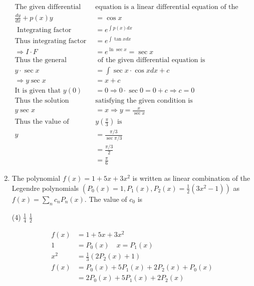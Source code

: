 \begin{enumerate}[label=\color{ocre}\textbf{\arabic*.}]
{}
\begin{answer}
	$$
	\begin{aligned}
	\text{The given differential }&\text{equation is a linear differential equation of the form}\\
	\frac{d y}{d x}+p(x) y&=\cos x\\
	\text{	Integrating factor }&=e^{\int p(x) d x}\\
	\text{Thus integrating factor }&=e^{\int \tan x d x}\\
	\Rightarrow I \cdot F&=e^{\ln \sec x}=\sec x\\
	\text{Thus the general solution}&\text{ of the given differential equation is}\\
	y \cdot \sec x&=\int \sec x \cdot \cos x d x+c\\
	\Rightarrow y \sec x&=x+c\\
	\text{It is given that }y(0)&=0 \Rightarrow 0 \cdot \sec 0=0+c \Rightarrow c=0\\
	\text{Thus the solution }&\text{satisfying the given condition is}\\
	y \sec x&=x \Rightarrow y=\frac{x}{\sec x}\\
	\text{Thus the value of }&y\left(\frac{\pi}{3}\right)\text{ is}\\
	y&=\frac{\pi / 3}{\sec \pi / 3} \\&=\frac{\pi / 3}{2}\\&=\frac{\pi}{6}
	\end{aligned}
	$$
\end{answer}
\item The polynomial $f(x)=1+5 x+3 x^{2}$ is written as linear combination of the Legendre polynomials
$\left(P_{0}(x)=1, P_{1}(x), P_{2}(x)=\frac{1}{2}\left(3 x^{2}-1\right)\right)$ as $f(x)=\sum_{n} c_{n} P_{n}(x)$. The value of $c_{0}$ is
{}
\begin{tasks}(4)
	\task[\textbf{A.}] $\frac{1}{4}$
	\task[\textbf{B.}] $\frac{1}{2}$
\end{tasks}
\begin{answer}
	$$
	\begin{aligned}
	f(x)&=1+5 x+3 x^{2}\\
	1&=P_{0}(x) \quad x=P_{1}(x)\\
	x^{2}&=\frac{1}{3}\left(2 P_{2}(x)+1\right)\\
	f(x)&=P_{0}(x)+5 P_{1}(x)+2 P_{2}(x)+P_{0}(x)\\
	&=2 P_{0}(x)+5 P_{1}(x)+2 P_{2}(x)\\

\end{aligned}$$
\end{answer}
\end{enumerate}
